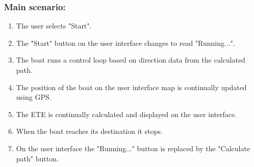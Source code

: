 \begin{framed}
	\subsubsection*{Main scenario:}
	\begin{enumerate}
		\item The user selects "Start".
		\item The "Start" button on the user interface changes to read "Running...".
		\item The boat runs a control loop based on direction data from the calculated path.
		\item The position of the boat on the user interface map is continually updated using GPS.
		\item The ETE is continually calculated and displayed on the user interface.
		\item When the boat reaches its destination it stops.
		\item On the user interface the "Running..." button is replaced by the "Calculate path" button.
	\end{enumerate}	
\end{framed}	

